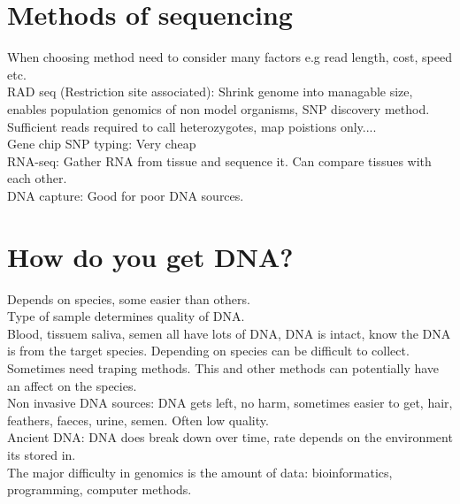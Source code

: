 \documentclass[11pt]{article}
\begin{document}
\section{Methods of sequencing}
When choosing method need to consider many factors e.g read length, cost, speed etc. \\
RAD seq (Restriction site associated): Shrink genome into managable size, enables population genomics of non model organisms, SNP discovery method. Sufficient reads required to call heterozygotes, map poistions only.... \\
Gene chip SNP typing: Very cheap \\
RNA-seq: Gather RNA from tissue and sequence it. Can compare tissues with each other. \\
DNA capture: Good for poor DNA sources. 
\section{How do you get DNA?}
Depends on species, some easier than others. \\
Type of sample determines quality of DNA. \\
Blood, tissuem saliva, semen all have lots of DNA, DNA is intact, know the DNA is from the target species. Depending on species can be difficult to collect. \\
Sometimes need traping methods. This and other methods can potentially have an affect on the species. \\
Non invasive DNA sources: DNA gets left, no harm, sometimes easier to get, hair, feathers, faeces, urine, semen. Often low quality. \\
Ancient DNA: DNA does break down over time, rate depends on the environment its stored in. \\
The major difficulty in genomics is the amount of data: bioinformatics, programming, computer methods.
\end{document}
